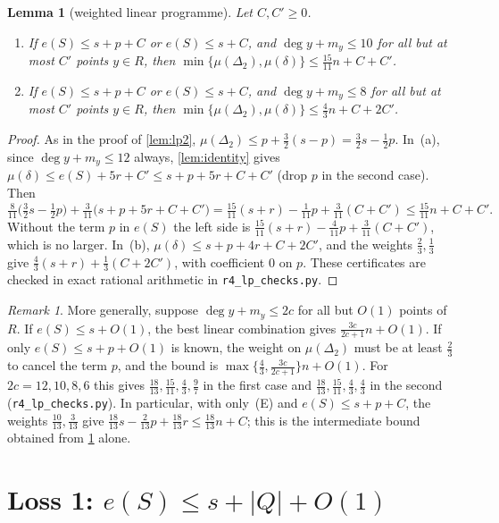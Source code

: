 \documentclass[11pt]{amsart}
\newtheorem{lemma}[theorem]{Lemma}
\theoremstyle{definition}
\theoremstyle{remark}
\newtheorem{remark}[theorem]{Remark}
\newcommand{\Dt}{\Delta_2}
\newcommand{\mult}{\mu}
\begin{document}
\begin{lemma}[weighted linear programme]\label{lem:lp3}
Let $C,C'\ge0$.
\begin{enumerate}[label=(\alph*)]
\item If $e(S)\le s+p+C$ or $e(S)\le s+C$, and $\deg y+m_y\le10$ for all but at most $C'$ points $y\in R$, then $\min\{\mult(\Dt),\mult(\delta)\}\le\frac{15}{11}n+C+C'$.
\item If $e(S)\le s+p+C$ or $e(S)\le s+C$, and $\deg y+m_y\le8$ for all but at most $C'$ points $y\in R$, then $\min\{\mult(\Dt),\mult(\delta)\}\le\frac43n+C+2C'$.
\end{enumerate}
\end{lemma}
\begin{proof}
As in the proof of \cref{lem:lp2}, $\mult(\Dt)\le p+\frac32(s-p)=\frac32s-\frac12p$. In~(a), since $\deg y+m_y\le12$ always, \cref{lem:identity} gives $\mult(\delta)\le e(S)+5r+C'\le s+p+5r+C+C'$ (drop $p$ in the second case). Then
\[
\tfrac{8}{11}\bigl(\tfrac32s-\tfrac12p\bigr)+\tfrac{3}{11}\bigl(s+p+5r+C+C'\bigr)=\tfrac{15}{11}(s+r)-\tfrac1{11}p+\tfrac3{11}(C+C')\le\tfrac{15}{11}n+C+C'.
\]
Without the term $p$ in $e(S)$ the left side is $\frac{15}{11}(s+r)-\frac4{11}p+\frac{3}{11}(C+C')$, which is no larger. In~(b), $\mult(\delta)\le s+p+4r+C+2C'$, and the weights $\frac23,\frac13$ give $\frac43(s+r)+\frac13(C+2C')$, with coefficient $0$ on $p$. These certificates are checked in exact rational arithmetic in \texttt{r4\_lp\_checks.py}.
\end{proof}

\begin{remark}\label{rem:lpgeneral}
More generally, suppose $\deg y+m_y\le 2c$ for all but $O(1)$ points of $R$. If $e(S)\le s+O(1)$, the best linear combination gives $\frac{3c}{2c+1}n+O(1)$. If only $e(S)\le s+p+O(1)$ is known, the weight on $\mult(\Dt)$ must be at least $\frac23$ to cancel the term $p$, and the bound is $\max\{\frac43,\frac{3c}{2c+1}\}n+O(1)$. For $2c=12,10,8,6$ this gives $\frac{18}{13},\frac{15}{11},\frac43,\frac97$ in the first case and $\frac{18}{13},\frac{15}{11},\frac43,\frac43$ in the second (\texttt{r4\_lp\_checks.py}). In particular, with only~(E) and $e(S)\le s+p+C$, the weights $\frac{10}{13},\frac{3}{13}$ give $\frac{18}{13}s-\frac2{13}p+\frac{18}{13}r\le\frac{18}{13}n+C$; this is the intermediate bound obtained from \cref{sec:loss1} alone.
\end{remark}

\section{Loss 1: \texorpdfstring{$e(S)\le s+|Q|+O(1)$}{e(S) <= s + |Q| + O(1)}}\label{sec:loss1}
\end{document}
